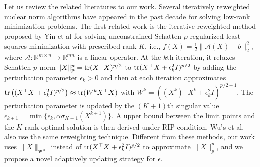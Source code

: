 \documentclass[twoside,11pt]{article}
\numberwithin{equation}{section}
\begin{document}
Let us review the related literatures to our work.  Several iteratively reweighted nuclear norm algorithms have appeared in the past decade for solving low-rank minimization problems. 
The first related work \cite{SpByIRSqYin_SIAM_2013}  is the iterative reweighted  method  proposed by Yin et al for 
solving unconstrained  Schatten-$p$ regularized  least squares  minimization with prescribed rank $K$, i.e., $f(X) =  \frac{1}{2 } \|\mathcal{A}(X) - b \|_{2}^{2}$, where  $\mathcal{A}:  \mathbb{R}^{m\times{n}}  \to \mathbb{R}^{mn}$ is a  linear operator. 
At the $k$th iteration,  it relaxes Schatten-$p$ norm $\|X\|_{p}^{p} = {\rm tr}(X^{\top}X )^{p/2}$  to ${\rm tr}(X^{\top}X+ \epsilon_k^{2}I)^{p/2}$ by adding the perturbation  parameter $\epsilon_k>0$ and 
then at each iteration approximates ${\rm tr}\left( (X^{\top}X+\epsilon_k^{2}I)^{p/2} \right) \approx {\rm tr}(W^{k}X^{\top}X)$ with $W^{k} = ((X^{k})^{\top} X^{k} + \epsilon_k^{2} I)^{p/2-1}$.  
The perturbation parameter is updated by the $(K+1)$th singular value  
$\epsilon_{k+1} = \min{\{\epsilon_{k}, \alpha\sigma_{K+1}(X^{k+1}) \}}$. A upper bound between the limit points and the $K$-rank optimal solution is then derived under RIP condition.  
Wu's et al.~\cite{LRMR_WuQiong_2018} also use the same  reweighting technique. Different from these methods,  our work uses $ \|X\|_{\mathbf{w}*}  $ instead of ${\rm tr}(X^{\top}X+ \epsilon_k^{2}I)^{p/2}$  to approximate   $\|X\|_p^p$, and we propose a novel adaptively updating strategy for $\epsilon$.
\end{document}
